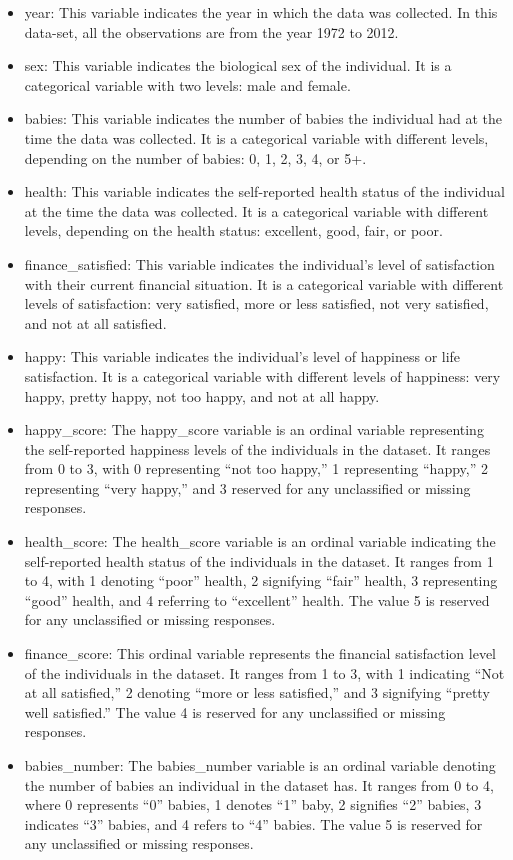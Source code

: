 \documentclass[
  letterpaper,
  DIV=11,
  numbers=noendperiod]{scrartcl}
\providecommand{\tightlist}{%
  \setlength{\itemsep}{0pt}\setlength{\parskip}{0pt}}\usepackage{longtable,booktabs,array}
\begin{document}
\begin{itemize}
\tightlist
\item
  year: This variable indicates the year in which the data was
  collected. In this data-set, all the observations are from the year
  1972 to 2012.
\item
  sex: This variable indicates the biological sex of the individual. It
  is a categorical variable with two levels: male and female.
\item
  babies: This variable indicates the number of babies the individual
  had at the time the data was collected. It is a categorical variable
  with different levels, depending on the number of babies: 0, 1, 2, 3,
  4, or 5+.
\item
  health: This variable indicates the self-reported health status of the
  individual at the time the data was collected. It is a categorical
  variable with different levels, depending on the health status:
  excellent, good, fair, or poor.
\item
  finance\_satisfied: This variable indicates the individual's level of
  satisfaction with their current financial situation. It is a
  categorical variable with different levels of satisfaction: very
  satisfied, more or less satisfied, not very satisfied, and not at all
  satisfied.
\item
  happy: This variable indicates the individual's level of happiness or
  life satisfaction. It is a categorical variable with different levels
  of happiness: very happy, pretty happy, not too happy, and not at all
  happy.
\item
  happy\_score: The happy\_score variable is an ordinal variable
  representing the self-reported happiness levels of the individuals in
  the dataset. It ranges from 0 to 3, with 0 representing ``not too
  happy,'' 1 representing ``happy,'' 2 representing ``very happy,'' and
  3 reserved for any unclassified or missing responses.
\item
  health\_score: The health\_score variable is an ordinal variable
  indicating the self-reported health status of the individuals in the
  dataset. It ranges from 1 to 4, with 1 denoting ``poor'' health, 2
  signifying ``fair'' health, 3 representing ``good'' health, and 4
  referring to ``excellent'' health. The value 5 is reserved for any
  unclassified or missing responses.
\item
  finance\_score: This ordinal variable represents the financial
  satisfaction level of the individuals in the dataset. It ranges from 1
  to 3, with 1 indicating ``Not at all satisfied,'' 2 denoting ``more or
  less satisfied,'' and 3 signifying ``pretty well satisfied.'' The
  value 4 is reserved for any unclassified or missing responses.
\item
  babies\_number: The babies\_number variable is an ordinal variable
  denoting the number of babies an individual in the dataset has. It
  ranges from 0 to 4, where 0 represents ``0'' babies, 1 denotes ``1''
  baby, 2 signifies ``2'' babies, 3 indicates ``3'' babies, and 4 refers
  to ``4'' babies. The value 5 is reserved for any unclassified or
  missing responses.
\end{itemize}
\end{document}

